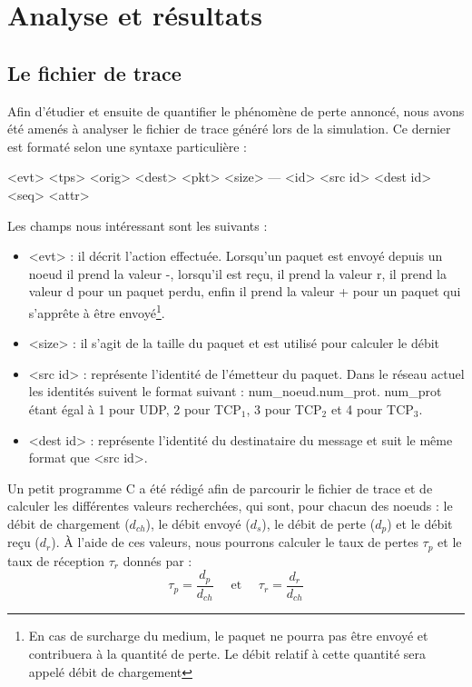 \documentclass[a4paper]{article}
\begin{document}



\section{Analyse et résultats}

\subsection{Le fichier de trace}

Afin d'étudier et ensuite de quantifier le phénomène de perte annoncé, nous avons été amenés à
analyser le fichier de trace généré lors de la simulation. Ce dernier est formaté selon une syntaxe
particulière : 

\textrm{<evt> <tps> <orig> <dest> <pkt> <size> --- <id> <src id> <dest id> <seq> <attr>}

Les champs nous intéressant sont les suivants : \begin{itemize}
\item \textrm{<evt>} : il décrit l'action effectuée. Lorsqu'un paquet est envoyé depuis un noeud il
prend la valeur \textrm{-}, lorsqu'il est reçu, il prend la valeur \textrm{r}, il prend la
valeur \textrm{d} pour un paquet perdu, enfin il prend la valeur \textrm{+} pour un
paquet qui s'apprête à être envoyé\footnote{En cas de surcharge du medium, le paquet ne pourra pas
être envoyé et contribuera à la quantité de perte. Le débit relatif à cette quantité sera appelé
débit de chargement}.
\item \textrm{<size>} : il s'agit de la taille du paquet et est utilisé pour calculer le débit
\item \textrm{<src id>} : représente l'identité de l'émetteur du paquet. Dans le réseau actuel les
identités suivent le format suivant : \textrm{num\_noeud.num\_prot}. \textrm{num\_prot} étant égal à
1 pour UDP, 2 pour TCP$_1$, 3 pour TCP$_2$ et 4 pour TCP$_3$.
\item \textrm{<dest id>} : représente l'identité du destinataire du message et suit le même format
que \textrm{<src id>}.
\end{itemize}

Un petit programme C a été rédigé afin de parcourir le fichier de trace et de calculer les
différentes valeurs recherchées, qui sont, pour chacun des noeuds : le débit de chargement
($d_{ch}$), le débit envoyé ($d_s$), le débit de perte ($d_p$) et le débit reçu ($d_r$). À l'aide de
ces valeurs, nous pourrons calculer le taux de pertes $\tau_p$ et le taux de réception $\tau_r$
donnés par : $$
\tau_p = \frac{d_p}{d_{ch}} \quad \mbox{ et } \quad \tau_r = \frac{d_r}{d_{ch}} $$
\end{document}
